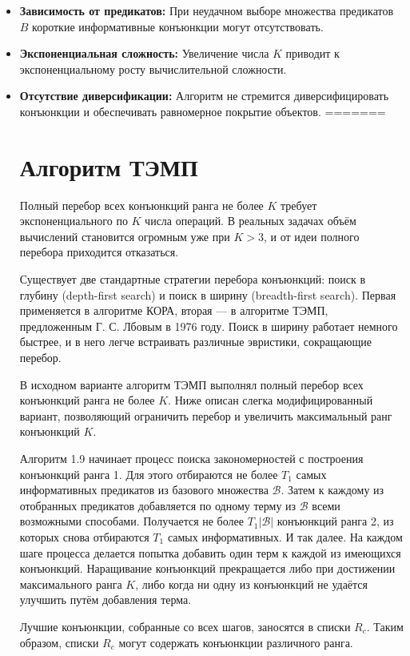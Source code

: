 \begin{itemize}
    \item \textbf{Зависимость от предикатов:} При неудачном выборе множества предикатов \(B\) короткие информативные конъюнкции могут отсутствовать.
    \item \textbf{Экспоненциальная сложность:} Увеличение числа \(K\) приводит к экспоненциальному росту вычислительной сложности.
    \item \textbf{Отсутствие диверсификации:} Алгоритм не стремится диверсифицировать конъюнкции и обеспечивать равномерное покрытие объектов.
=======
\section{Алгоритм ТЭМП}

Полный перебор всех конъюнкций ранга не более $K$ требует экспоненциального по $K$ числа операций. В реальных задачах объём вычислений становится огромным уже при $K > 3$, и от идеи полного перебора приходится отказаться.

Существует две стандартные стратегии перебора конъюнкций: поиск в глубину (depth-first search) и поиск в ширину (breadth-first search). Первая применяется в алгоритме КОРА, вторая — в алгоритме ТЭМП, предложенным Г. С. Лбовым в 1976 году. Поиск в ширину работает немного быстрее, и в него легче встраивать различные эвристики, сокращающие перебор.

В исходном варианте алгоритм ТЭМП выполнял полный перебор всех конъюнкций ранга не более $K$. Ниже описан слегка модифицированный вариант, позволяющий ограничить перебор и увеличить максимальный ранг конъюнкций $K$.

Алгоритм 1.9 начинает процесс поиска закономерностей с построения конъюнкций ранга 1. Для этого отбираются не более $T_1$ самых информативных предикатов из базового множества $\mathcal{B}$. Затем к каждому из отобранных предикатов добавляется по одному терму из $\mathcal{B}$ всеми возможными способами. Получается не более $T_1|\mathcal{B}|$ конъюнкций ранга 2, из которых снова отбираются $T_1$ самых информативных. И так далее. На каждом шаге процесса делается попытка добавить один терм к каждой из имеющихся конъюнкций. Наращивание конъюнкций прекращается либо при достижении максимального ранга $K$, либо когда ни одну из конъюнкций не удаётся улучшить путём добавления терма.

Лучшие конъюнкции, собранные со всех шагов, заносятся в списки $R_c$. Таким образом, списки $R_c$ могут содержать конъюнкции различного ранга.


\end{itemize}

